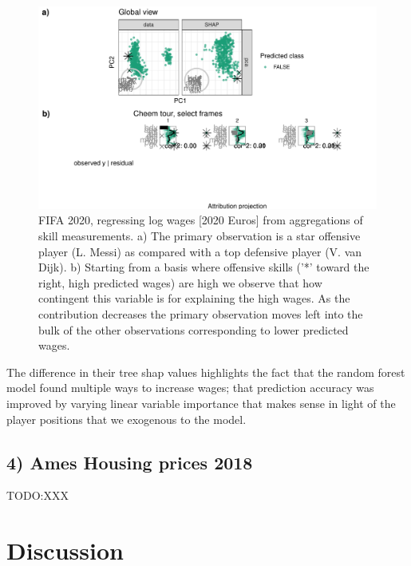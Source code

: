 \documentclass[
]{article}
\begin{document}
\begin{figure}

{\centering \includegraphics[width=1\linewidth]{./figures/case_fifa} 

}

\caption{FIFA 2020, regressing log wages [2020 Euros] from aggregations of skill measurements. a) The primary observation is a star offensive player (L. Messi) as compared with a top defensive player (V. van Dijk). b) Starting from a basis where offensive skills ('*' toward the right, high predicted wages) are high we observe that how contingent this variable is for explaining the high wages. As the contribution decreases the primary observation moves left into the bulk of the other observations corresponding to lower predicted wages.}\label{fig:casefifa}
\end{figure}

The difference in their tree shap values highlights the fact that the random forest model found multiple ways to increase wages; that prediction accuracy was improved by varying linear variable importance that makes sense in light of the player positions that we exogenous to the model.

\hypertarget{ames-housing-prices-2018}{%
\subsection{4) Ames Housing prices 2018}\label{ames-housing-prices-2018}}

TODO:XXX

\hypertarget{sec:discussion}{%
\section{Discussion}\label{sec:discussion}}
\end{document}
